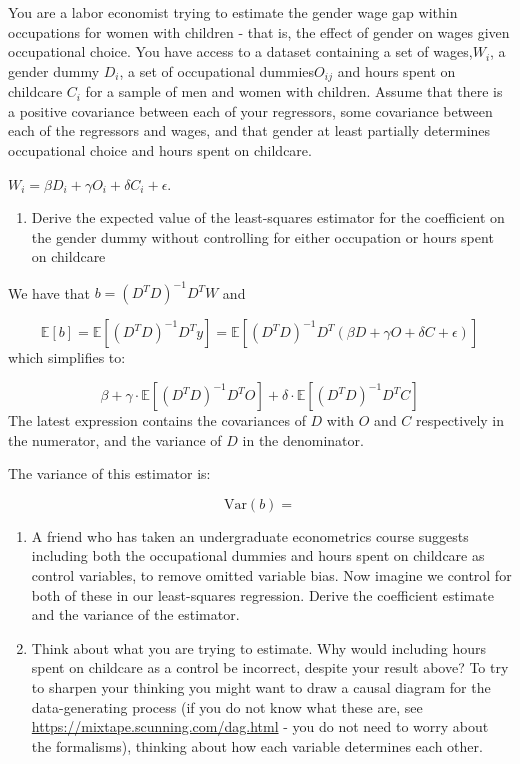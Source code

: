 \documentclass[
]{article}
\providecommand{\tightlist}{%
  \setlength{\itemsep}{0pt}\setlength{\parskip}{0pt}}
\begin{document}
You are a labor economist trying to estimate the gender wage gap within
occupations for women with children - that is, the effect of gender on
wages given occupational choice. You have access to a dataset containing
a set of wages,\(W_i\), a gender dummy \(D_i\), a set of occupational
dummies\(O_{ij}\) and hours spent on childcare \(C_i\) for a sample of
men and women with children. Assume that there is a positive covariance
between each of your regressors, some covariance between each of the
regressors and wages, and that gender at least partially determines
occupational choice and hours spent on childcare.

\(W_i = \beta D_i + \gamma O_i + \delta C_i + \epsilon\).

\begin{enumerate}
\def\labelenumi{\alph{enumi}.}
\tightlist
\item
  Derive the expected value of the least-squares estimator for the
  coefficient on the gender dummy without controlling for either
  occupation or hours spent on childcare
\end{enumerate}

We have that \(b = (D^T D)^{-1}D^T W\) and

\[
\mathbb{E}[b] = \mathbb{E}[(D^T D)^{-1}D^T y] = \mathbb{E}[(D^T D)^{-1}D^T(\beta D + \gamma O + \delta C + \epsilon)] 
\] which simplifies to:

\[
\beta + \gamma \cdot \mathbb{E}[(D^T D)^{-1} D^T O] + \delta \cdot \mathbb{E}[(D^T D)^{-1} D^T C]
\] The latest expression contains the covariances of \(D\) with \(O\)
and \(C\) respectively in the numerator, and the variance of \(D\) in
the denominator.

The variance of this estimator is:

\[
\text{Var}(b) = 
\]

\begin{enumerate}
\def\labelenumi{\alph{enumi}.}
\setcounter{enumi}{1}
\item
  A friend who has taken an undergraduate econometrics course suggests
  including both the occupational dummies and hours spent on childcare
  as control variables, to remove omitted variable bias. Now imagine we
  control for both of these in our least-squares regression. Derive the
  coefficient estimate and the variance of the estimator.
\item
  Think about what you are trying to estimate. Why would including hours
  spent on childcare as a control be incorrect, despite your result
  above? To try to sharpen your thinking you might want to draw a causal
  diagram for the data-generating process (if you do not know what these
  are, see \url{https://mixtape.scunning.com/dag.html} - you do not need
  to worry about the formalisms), thinking about how each variable
  determines each other.
\end{enumerate}
\end{document}
